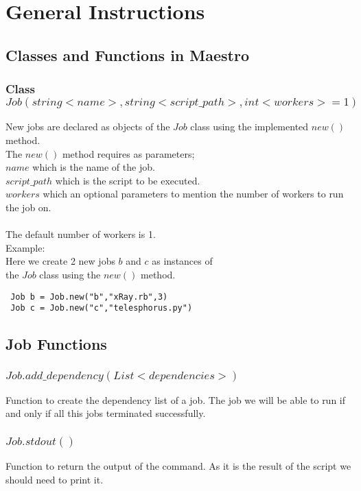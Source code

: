 \section{General Instructions}
\label{sect:general}

\subsection*{Classes and Functions in Maestro}

\subsubsection*{Class $Job(string <name>, string <script\_path>, int <workers>=1)$}
New jobs are declared as objects of the $Job$ class using the implemented $new()$ method.\\
The $new()$ method requires as parameters;\\
$name$ which is the name of the job.\\
$script\_path$ which is the script to be executed.\\
$workers$ which an optional parameters to mention the number of workers to run the job on.\\\\
The default number of workers is 1.\\
Example:\\
Here we create 2 new jobs $b$ and $c$ as instances of \\the $Job$ class using the $new()$ method.
\begin{verbatim}
 Job b = Job.new("b","xRay.rb",3)
 Job c = Job.new("c","telesphorus.py")
\end{verbatim}
\subsection*{Job Functions}
\subsubsection*{$Job.add\_dependency(List <dependencies>)$}
Function to create the dependency list of a job. The job we will be
able to run if and only if all this jobs terminated successfully.
\subsubsection*{$Job.stdout()$}
Function to return the output of the command. As it is the result of the script we should need to print it.
